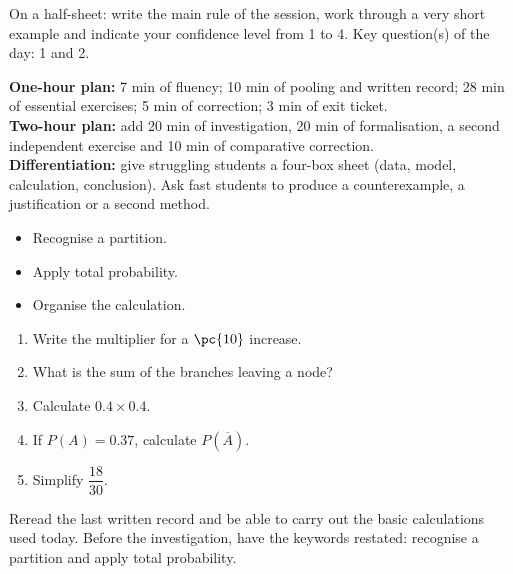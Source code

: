 \begin{exitticket}[3 minutes]On a half-sheet: write the main rule of the session, work through a very short example and indicate your confidence level from 1 to 4. Key question(s) of the day: 1 and 2.\end{exitticket}

\ifmxteacher
\begin{method}
\textbf{One-hour plan:} 7 min of fluency; 10 min of pooling and written record; 28 min of essential exercises; 5 min of correction; 3 min of exit ticket.\\
\textbf{Two-hour plan:} add 20 min of investigation, 20 min of formalisation, a second independent exercise and 10 min of comparative correction.\\
\textbf{Differentiation:} give struggling students a four-box sheet (data, model, calculation, conclusion). Ask fast students to produce a counterexample, a justification or a second method.
\end{method}
\fi
{}
    \begin{objectives}\begin{itemize}\item Recognise a partition.\item Apply total probability.\item Organise the calculation.\end{itemize}\end{objectives}
    \begin{fluency}\begin{enumerate}\item Write the multiplier for a $\pc{10}$ increase. \item What is the sum of the branches leaving a node? \item Calculate $\num{0,4}\times\num{0,4}$. \item If $P(A)=\num{0,37}$, calculate $P(\overline A)$. \item Simplify $\dfrac{18}{30}$. \end{enumerate}\end{fluency}
    \begin{prerequisites}Reread the last written record and be able to carry out the basic calculations used today. Before the investigation, have the keywords restated: recognise a partition and apply total probability.\end{prerequisites}

